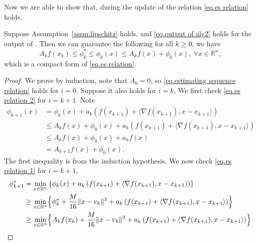 \documentclass{mcom-l}
\numberwithin{equation}{section}
\begin{document}
Now we are able to show that, during the update of  the relation \eqref{eq.es relation} holds.
\begin{lemma}\label{lem.estimate sequence}
    Suppose Assumption~\ref{assm.lipschitz} holds, and \eqref{eq.output of alg2} holds for the output of . Then we can guarantee the following for all $k\geq 0$, we have
    \begin{equation}
        \label{eq.estimating sequence relation}
        A_k f(x_k)\leq \phi_k^*  \leq \phi_k(x)\leq A_k f(x)+\phi_0(x), \ \forall x\in \mathbb{R}^n,
    \end{equation}
    which is a compact form of \eqref{eq.es relation}.
\end{lemma}
\begin{proof}
    We prove by induction, note that $A_0 = 0$, so \eqref{eq.estimating sequence relation} holds for $i=0$. Suppose it also holds for $i=k$,
    We first check \eqref{eq.es relation 2} for $i=k+1$. Note
    \begin{align*}
        \phi_{k+1}(x) & =\phi_k(x)+a_k\left(f(x_{k+1})+\langle \nabla f(x_{k+1}),x-x_{k+1}\rangle \right)               \\
                      & \leq A_k f(x)+\phi_0(x) +a_k\left(f(x_{k+1})+\langle \nabla f(x_{k+1}),x-x_{k+1}\rangle \right) \\
                      & \leq A_k f(x)+\phi_0(x) +a_k f(x)                                                               \\
                      & =A_{k+1} f(x)+\phi_0(x).
    \end{align*}
    The first inequality is from the induction hypothesis.
    We now check \eqref{eq.es relation 1} for $i=k+1$,
    \begin{align*}
        \phi_{k+1}^*
         & = \min_{x\in\mathbb{R}^n} \left\{ \phi_k(x) + a_k \left(f(x_{k+1}) + \langle \nabla f(x_{k+1}), x - x_{k+1} \rangle \right) \right\} \\
         & \geq \min_{x\in\mathbb{R}^n} \Bigl\{ \phi_k^* + \frac{M}{16} \|x - v_k\|^3
        + a_k \left(f(x_{k+1}) + \langle \nabla f(x_{k+1}), x - x_{k+1} \rangle \right) \Bigr\}                                                 \\
         & \geq \min_{x\in\mathbb{R}^n} \Bigl\{ A_k f(x_k) + \frac{M}{16} \|x - v_k\|^3
        + a_k \left(f(x_{k+1}) + \langle \nabla f(x_{k+1}), x - x_{k+1} \rangle \right) \Bigr\}                                                 \\

\end{align*}
\end{proof}
\end{document}
